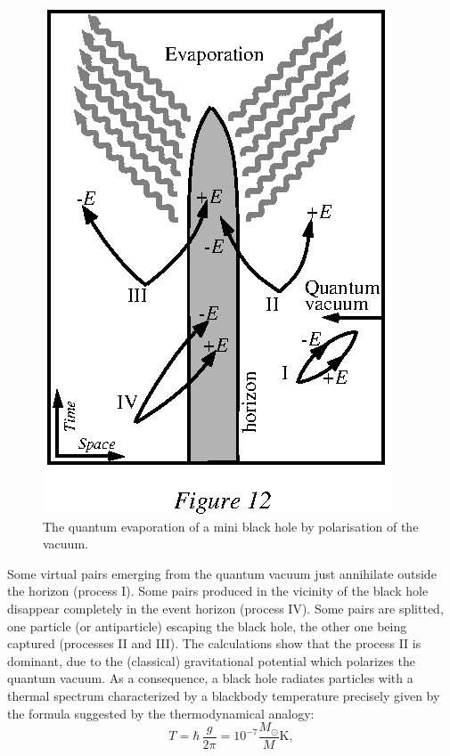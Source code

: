 \documentclass[12pt]{article}
\begin{document}
\begin{figure}[tb]
  \begin{center}
    \leavevmode
    \includegraphics{quantum.ps}
    \caption{The quantum evaporation of a mini black hole by
      polarisation of the vacuum.}
  \end{center}
\end{figure}
Some virtual pairs  emerging from the quantum vacuum
just annihilate outside the horizon (process I). Some pairs produced in the
vicinity of the black hole disappear completely in the event horizon (process
IV). Some pairs are splitted, one particle (or antiparticle) escaping the black
hole, the other one being captured (processes II and III). The calculations show
that the process II is dominant, due to the (classical) gravitational 
potential which polarizes the quantum vacuum. As a consequence,
a black hole radiates particles
with a thermal spectrum characterized by a blackbody temperature precisely
given by the formula suggested by the thermodynamical analogy:
 \begin{equation}
  T = \hbar \,\frac{g}{2\pi} = 10^{-7} \frac{M_{\odot}}{M} \textrm{K},   
        \label{luminet:11}
 \end{equation} 
\end{document}
